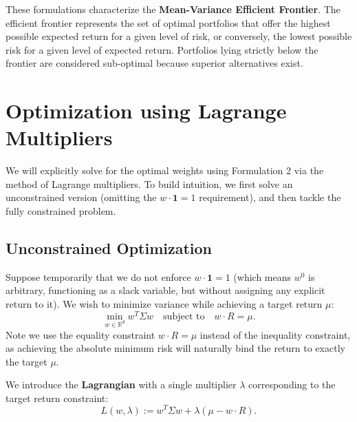 These formulations characterize the \textbf{Mean-Variance Efficient Frontier}. The efficient frontier represents the set of optimal portfolios that offer the highest possible expected return for a given level of risk, or conversely, the lowest possible risk for a given level of expected return. Portfolios lying strictly below the frontier are considered sub-optimal because superior alternatives exist.

\section{Optimization using Lagrange Multipliers}

We will explicitly solve for the optimal weights using Formulation 2 via the method of Lagrange multipliers. To build intuition, we first solve an unconstrained version (omitting the $w \cdot \mathbf{1}=1$ requirement), and then tackle the fully constrained problem.

\subsection{Unconstrained Optimization}
Suppose temporarily that we do not enforce $w \cdot \mathbf{1} = 1$ (which means $w^0$ is arbitrary, functioning as a slack variable, but without assigning any explicit return to it). We wish to minimize variance while achieving a target return $\mu$:
\begin{equation*}
    \min_{w \in \mathbb{R}^d} w^T \Sigma w \quad \text{subject to} \quad w \cdot R = \mu.
\end{equation*}
Note we use the equality constraint $w \cdot R = \mu$ instead of the inequality constraint, as achieving the absolute minimum risk will naturally bind the return to exactly the target $\mu$.

We introduce the \textbf{Lagrangian} with a single multiplier $\lambda$ corresponding to the target return constraint:
\begin{equation}
    L(w, \lambda) := w^T \Sigma w + \lambda(\mu - w \cdot R).
\end{equation}

